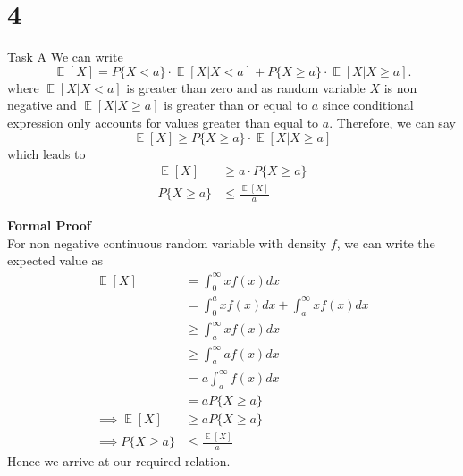 \chapter{4}
\begin{task}{Task A}
	We can write
	\begin{equation}
		\mathop{\mathbb{E}}[X]= P\{X<a\}\cdot \mathop{\mathbb{E}}[X|X<a]+P\{X\geq a\}\cdot  \mathop{\mathbb{E}}[X|X\geq a].
	\end{equation}
	where $\mathop{\mathbb{E}}[X|X<a]$ is greater than zero and as random variable $X $ is non negative and $\mathop{\mathbb{E}}[X|X\geq a]$ is greater than or equal to $a$ since conditional expression only accounts for values greater than equal to $a$. Therefore, we can say
	\begin{equation}
		\mathop{\mathbb{E}}[X]\geq P\{X\geq a\}\cdot  \mathop{\mathbb{E}}[X|X\geq a]
	\end{equation}
	which leads to
	\begin{align}
		\mathop{\mathbb{E}}[X] & \geq a\cdot P\{X\geq a\}              \\
		P\{X\geq a\}           & \leq \frac{\mathop{\mathbb{E}}[X]}{a}
	\end{align}

	\textbf{Formal Proof} \\
	For non negative continuous random variable with density $f$, we can write the expected value as
	\begin{align}
		\mathop{\mathbb{E}}[X]          & =\int_{0}^{\infty}xf(x)dx                        \\
		                                & = \int_{0}^{a}xf(x)dx + \int_{a}^{\infty}xf(x)dx \\
		                                & \geq \int_{a}^{\infty}xf(x)dx                    \\
		                                & \geq \int_{a}^{\infty}af(x)dx                    \\
		                                & = a \int_{a}^{\infty}f(x)dx                      \\
		                                & =aP\{X\geq a\}                                   \\
		\implies \mathop{\mathbb{E}}[X] & \geq aP\{X\geq a\}                               \\
		\implies P\{X\geq a\}           & \leq \frac{\mathop{\mathbb{E}}[X]}{a}
	\end{align}
	Hence we arrive at our required relation.
\end{task}


